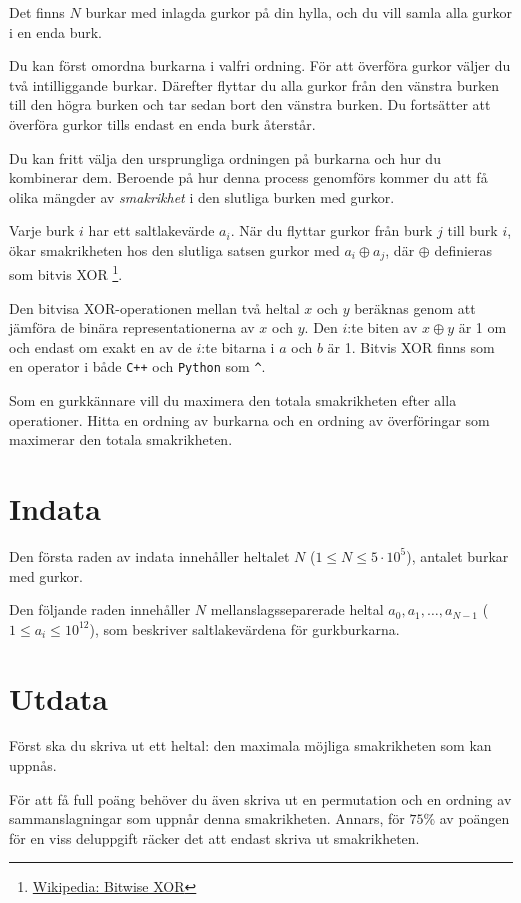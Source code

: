 \noindent

Det finns $N$ burkar med inlagda gurkor på din hylla, och du vill samla alla gurkor i en enda burk.

Du kan först omordna burkarna i valfri ordning. För att överföra gurkor väljer du två intilliggande burkar.
Därefter flyttar du alla gurkor från den vänstra burken till den högra burken och tar sedan bort den vänstra burken.
Du fortsätter att överföra gurkor tills endast en enda burk återstår.

Du kan fritt välja den ursprungliga ordningen på burkarna och hur du kombinerar dem. Beroende på hur denna process
genomförs kommer du att få olika mängder av \textit{smakrikhet} i den slutliga burken med gurkor.

Varje burk $i$ har ett saltlakevärde $a_i$. När du flyttar gurkor från burk $j$ till burk $i$, ökar smakrikheten
hos den slutliga satsen gurkor med
$a_i \oplus a_j$, där $\oplus$ definieras som bitvis XOR
\footnote{\href{https://en.wikipedia.org/wiki/Exclusive_or}{Wikipedia: Bitwise XOR}}.

Den bitvisa XOR-operationen mellan två heltal $x$ och $y$ beräknas genom att jämföra de binära representationerna av
$x$ och $y$. Den $i$:te biten av $x \oplus y$ är 1 om och endast om exakt en av de $i$:te bitarna i $a$ och $b$ är 1.
Bitvis XOR finns som en operator i både \texttt{C++} och \texttt{Python} som \verb|^|.

Som en gurkkännare vill du maximera den totala smakrikheten efter alla operationer.
Hitta en ordning av burkarna och en ordning av överföringar som maximerar den totala smakrikheten.

\section*{Indata}
\noindent
Den första raden av indata innehåller heltalet $N$ ($1 \leq N \leq 5 \cdot 10^5$), antalet burkar med gurkor.

Den följande raden innehåller $N$ mellanslagsseparerade heltal $a_0, a_1, \dots, a_{N-1}$ ($1 \leq a_i \leq 10^{12}$),
som beskriver saltlakevärdena för gurkburkarna.

\section*{Utdata}
\noindent
Först ska du skriva ut ett heltal: den maximala möjliga smakrikheten som kan uppnås.

För att få full poäng behöver du även skriva ut en permutation och en ordning av sammanslagningar som uppnår denna
smakrikheten. Annars, för $75\%$ av poängen för en viss deluppgift räcker det att endast skriva ut smakrikheten.

